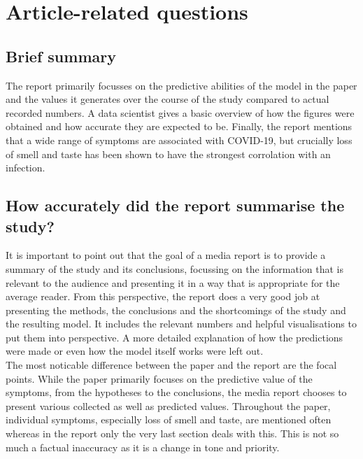 \documentclass{article}
\begin{document}
\section{Article-related questions}

\subsection{Brief summary}

The report primarily focusses on the predictive abilities of the model in the paper and
the values it generates over the course of the study compared to actual recorded numbers.
A data scientist gives a basic overview of how the figures were obtained and how accurate
they are expected to be. Finally, the report mentions that a wide range of symptoms
are associated with COVID-19, but crucially loss of smell and taste has been shown to
have the strongest corrolation with an infection.

\subsection{How accurately did the report summarise the study?}

It is important to point out that the goal of a media report is to provide
a summary of the study and its conclusions, focussing on the information that
is relevant to the audience and presenting it in a way that is appropriate for the
average reader. From this perspective, the report does a very good job at presenting
the methods, the conclusions and the shortcomings of the study and the resulting model.
It includes the relevant numbers and helpful visualisations to put them into perspective.
A more detailed explanation of how the predictions were made or even how the model itself
works were left out.\\
\indent The most noticable difference between the paper and the report are the focal points.
While the paper primarily focuses on the predictive value of the symptoms, 
from the hypotheses to the conclusions, the media report chooses to present
various collected as well as predicted values. Throughout the paper, individual symptoms, especially
loss of smell and taste, are mentioned often whereas in the report only the very last
section deals with this. This is not so much a factual inaccuracy as it is a 
change in tone and priority.
\end{document}
